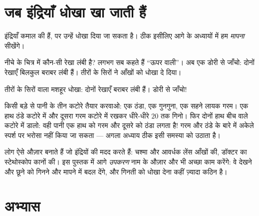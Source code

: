\section{जब इंद्रियाँ धोखा खा जाती हैं}

इंद्रियाँ कमाल की हैं, पर उन्हें धोखा दिया जा सकता है। ठीक इसीलिए आगे
के अध्यायों में हम \emph{मापना} सीखेंगे।

\begin{example}[दो रेखाएँ]\label{ex:g1:five-senses:lines}
नीचे के चित्र में कौन-सी रेखा लंबी है? लगभग सब कहते हैं ``ऊपर
वाली''। अब एक डोरी से जाँचो: दोनों रेखाएँ बिलकुल बराबर लंबी हैं। तीरों
के सिरों ने आँखों को धोखा दे दिया।
\end{example}

\begin{omfigure}

{\small तीरों के सिरों वाला मशहूर धोखा: दोनों रेखाएँ बराबर लंबी हैं।
डोरी से जाँचो!}
\end{omfigure}

\begin{example}[इसे करके देखो: तीन कटोरे]\label{ex:g1:five-senses:bowls}
किसी बड़े से पानी के तीन कटोरे तैयार करवाओ: एक ठंडा, एक गुनगुना, एक
सहने लायक गरम। एक हाथ ठंडे कटोरे में और दूसरा गरम कटोरे में रखकर
धीरे-धीरे $20$ तक गिनो। फिर दोनों हाथ बीच वाले कटोरे में डालो: वही
पानी एक हाथ को गरम और दूसरे को ठंडा लगता है! गरम और ठंडे के बारे में
अकेले स्पर्श पर भरोसा नहीं किया जा सकता --- अगला अध्याय ठीक इसी
समस्या को उठाता है।
\end{example}

\begin{remark}[इंद्रियों के मददगार]\label{rem:g1:five-senses:tools}
लोग ऐसे औज़ार बनाते हैं जो इंद्रियों की मदद करते हैं: चश्मा और
आवर्धक लेंस आँखों की, डॉक्टर का स्टेथोस्कोप कानों की। इस पुस्तक में
आगे \emph{उपकरण} नाम के औज़ार और भी अच्छा काम करेंगे: वे देखने और छूने
को गिनने और मापने में बदल देंगे, और गिनती को धोखा देना कहीं ज़्यादा
कठिन है।
\end{remark}

\section{अभ्यास}

